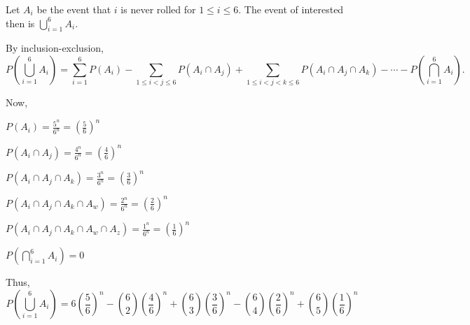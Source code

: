 Let $A_{i}$ be the event that $i$ is never rolled for $1 \leq i \leq 6$.
The event of interested then is $\bigcup\limits_{i=1}^{6}A_{i}.$

By inclusion-exclusion, 
$$P(\bigcup\limits_{i=1}^{6}A_{i}) = \sum_{i=1}^{6}P(A_{i}) - \sum_{1 \leq i < j \leq 6}P(A_{i} \cap A_{j}) + \sum_{1 \leq i < j < k \leq 6}P(A_{i} \cap A_{j} \cap A_{k}) - \cdots - P(\bigcap\limits_{i=1}^{6}A_{i}).$$

Now,


$P(A_{i}) = \frac{5^{n}}{6^{n}} = (\frac{5}{6})^{n}$

$P(A_{i} \cap A_{j}) = \frac{4^{n}}{6^{n}} = (\frac{4}{6})^{n}$

$P(A_{i} \cap A_{j} \cap A_{k}) = \frac{3^{n}}{6^{n}} = (\frac{3}{6})^{n}$

$P(A_{i} \cap A_{j} \cap A_{k} \cap A_{w}) = \frac{2^{n}}{6^{n}} = (\frac{2}{6})^{n}$

$P(A_{i} \cap A_{j} \cap A_{k} \cap A_{w} \cap A_{z}) = \frac{1^{n}}{6^{n}} = (\frac{1}{6})^{n}$

$P(\bigcap\limits_{i=1}^{6}A_{i}) = 0$

Thus, 
$$P(\bigcup\limits_{i=1}^{6}A_{i}) = 6(\frac{5}{6})^{n} - \binom{6}{2}(\frac{4}{6})^{n} + \binom{6}{3}(\frac{3}{6})^{n} - \binom{6}{4}(\frac{2}{6})^{n} + \binom{6}{5}(\frac{1}{6})^{n}$$